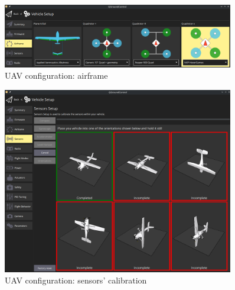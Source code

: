\begin{figure}[!hbt]
  \centering
  \includegraphics[width=0.9\textwidth]{./img/png/qgc-airframe} 
  \caption{UAV configuration: airframe}
  \label{fig:uav-cfg-airframe}
\end{figure}

\begin{figure}[!hbt]
  \centering
  \includegraphics[width=0.9\textwidth]{./img/png/qgc-sensors} 
  \caption{UAV configuration: sensors' calibration}
  \label{fig:uav-cfg-sensors}
\end{figure}



